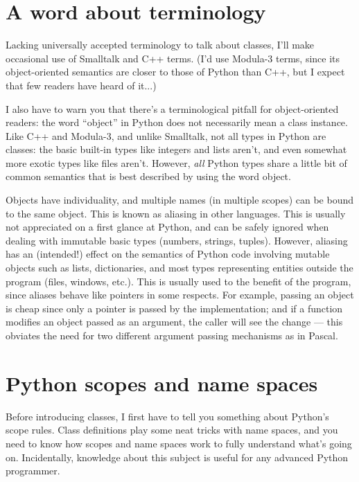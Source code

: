 \section{A word about terminology}

Lacking universally accepted terminology to talk about classes, I'll
make occasional use of Smalltalk and C++ terms.  (I'd use Modula-3
terms, since its object-oriented semantics are closer to those of
Python than C++, but I expect that few readers have heard of it...)

I also have to warn you that there's a terminological pitfall for
object-oriented readers: the word ``object'' in Python does not
necessarily mean a class instance.  Like C++ and Modula-3, and unlike
Smalltalk, not all types in Python are classes: the basic built-in
types like integers and lists aren't, and even somewhat more exotic
types like files aren't.  However, {\em all} Python types share a little
bit of common semantics that is best described by using the word
object.

Objects have individuality, and multiple names (in multiple scopes)
can be bound to the same object.  This is known as aliasing in other
languages.  This is usually not appreciated on a first glance at
Python, and can be safely ignored when dealing with immutable basic
types (numbers, strings, tuples).  However, aliasing has an
(intended!) effect on the semantics of Python code involving mutable
objects such as lists, dictionaries, and most types representing
entities outside the program (files, windows, etc.).  This is usually
used to the benefit of the program, since aliases behave like pointers
in some respects.  For example, passing an object is cheap since only
a pointer is passed by the implementation; and if a function modifies
an object passed as an argument, the caller will see the change --- this
obviates the need for two different argument passing mechanisms as in
Pascal.


\section{Python scopes and name spaces}

Before introducing classes, I first have to tell you something about
Python's scope rules.  Class definitions play some neat tricks with
name spaces, and you need to know how scopes and name spaces work to
fully understand what's going on.  Incidentally, knowledge about this
subject is useful for any advanced Python programmer.

